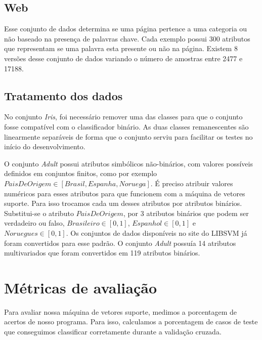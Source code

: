 \subsection{Web} \label{sec:Web}
Esse conjunto de dados determina se uma página pertence a uma categoria ou não baseado na presença de palavras chave. Cada exemplo possui 300 atributos que representam se uma palavra esta presente ou não na página. Existem 8 versões desse conjunto de dados variando o número de amostras entre 2477 e 17188.

\subsection{Tratamento dos dados}
No conjunto {\em Iris}, foi necessário remover uma das classes para que o conjunto fosse compatível com o classificador binário. As duas classes remanescentes são linearmente separáveis de forma que o conjunto serviu para facilitar os testes no início do desenvolvimento.

O conjunto \emph{Adult} possui atributos simbólicos não-binários, com valores possíveis definidos em conjuntos finitos, como por exemplo $PaisDeOrigem \in \left [ Brasil,Espanha,Noruega \right ]$. É preciso atribuir valores numéricos para esses atributos para que funcionem com a máquina de vetores suporte. Para isso trocamos cada um desses atributos por atributos binários. Substitui-se o atributo $PaisDeOrigem$, por 3 atributos binários que podem ser verdadeiro ou falso, $Brasileiro \in \left [ 0,1 \right ]$, $Espanhol \in \left [ 0,1 \right ]$ e $Noruegues \in \left [ 0,1 \right ]$. Os conjuntos de dados disponíveis no site do LIBSVM já foram convertidos para esse padrão. O conjunto \emph{Adult} possuía 14 atributos multivariados que foram convertidos em 119 atributos binários.

\section{Métricas de avaliação}
Para avaliar nossa máquina de vetores suporte, medimos a porcentagem de acertos de nosso programa. Para isso, calculamos a porcentagem de casos de teste que conseguimos classificar corretamente durante a validação cruzada. 


